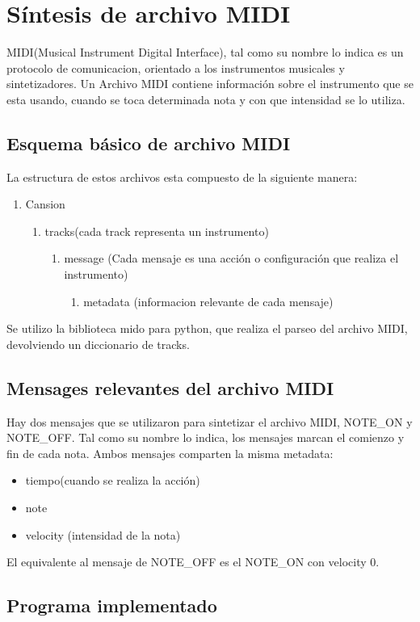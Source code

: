 \documentclass[../ASSD_TP2.tex]{subfiles}
\begin{document}
\section*{Síntesis de archivo MIDI}
MIDI(Musical Instrument Digital Interface), tal como su nombre lo indica es un protocolo de comunicacion, orientado a los instrumentos musicales y sintetizadores. Un Archivo MIDI contiene información sobre el instrumento que se esta usando, cuando se toca determinada nota y con que intensidad se lo utiliza. 
\subsection*{Esquema básico de archivo MIDI}
La estructura de estos archivos esta compuesto de la siguiente manera:
\begin{enumerate}
\item Cansion
	\begin{enumerate}
		\item tracks(cada track representa un instrumento)
			\begin{enumerate}
				\item message (Cada mensaje es una acción o configuración que realiza el instrumento)
					\begin{enumerate}
						\item metadata (informacion relevante de cada mensaje)
					\end{enumerate}						
			\end{enumerate}
	\end{enumerate}
\end{enumerate}
Se utilizo la biblioteca mido para python, que realiza el parseo del archivo MIDI, devolviendo un diccionario de tracks.
\subsection*{Mensages relevantes del archivo MIDI}

Hay dos mensajes que se utilizaron para sintetizar el archivo MIDI, NOTE\_ON y NOTE\_OFF. Tal como su nombre lo indica, los mensajes marcan el comienzo y fin de cada nota. Ambos mensajes comparten la misma metadata:
\begin{itemize}
\item tiempo(cuando se realiza la acción)
\item note 
\item velocity (intensidad de la nota)

\end{itemize}
El equivalente al mensaje de NOTE\_OFF es el NOTE\_ON con velocity 0.

\subsection*{Programa implementado}
\end{document}
